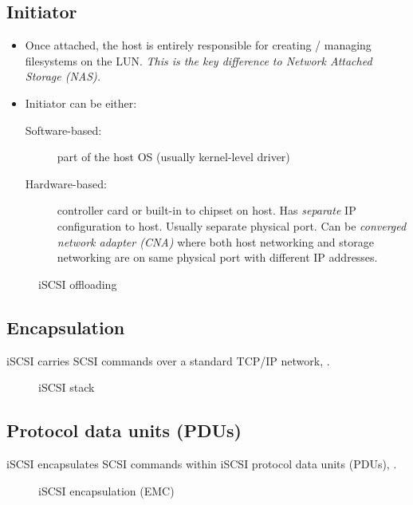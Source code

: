 \subsection{Initiator}\label{initiator}

\begin{itemize}
\item
  Once attached, the host is entirely responsible for creating /
  managing filesystems on the LUN. \emph{This is the key difference to
  Network Attached Storage (NAS).}
\item
  Initiator can be either:

  \begin{description}
  \item[Software-based:]
  part of the host OS (usually kernel-level driver)
  \item[Hardware-based:]
  controller card or built-in to chipset on host. Has \emph{separate} IP
  configuration to host. Usually separate physical port. Can be
  \emph{converged network adapter (CNA)} where both host networking and
  storage networking are on same physical port with different IP
  addresses.
  \end{description}
\end{itemize}

\begin{figure}
\centering
\caption{iSCSI offloading{}}
\end{figure}

\subsection{Encapsulation}\label{encapsulation}

iSCSI carries SCSI commands over a standard TCP/IP network, .

\begin{figure}
\centering
\caption{iSCSI stack{}}
\end{figure}

\subsection{Protocol data units (PDUs)}\label{protocol-data-units-pdus}

iSCSI encapsulates SCSI commands within iSCSI protocol data units
(PDUs), .

\begin{figure}
\centering
\caption{iSCSI encapsulation (EMC){}}
\end{figure}

